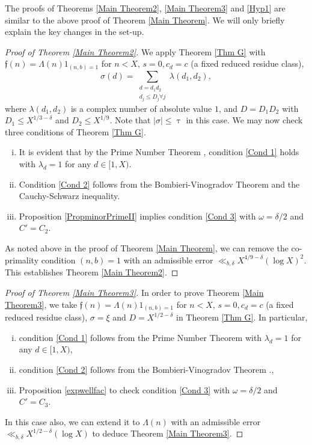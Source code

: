 \documentclass[12pt]{amsart}
\numberwithin{equation}{section}
\theoremstyle{remark}
\theoremstyle{definition}
\begin{document}
The proofs of Theorems \ref{Main Theorem2}, \ref{Main Theorem3} and \ref{Hyp1} are similar to the above proof of Theorem \ref{Main Theorem}. We will only briefly explain the key changes in the set-up.

\begin{proof}[Proof of Theorem \ref{Main Theorem2}]
We apply Theorem \ref{Thm G} with $\mathfrak{f}(n)=\Lambda(n)1_{(n, b)=1}$ for $n<X$, $s=0, c_d=c$ (a fixed reduced residue class), \[{\sigma}(d) =\sum_{\substack{d=d_1d_2\\ d_j \leq D_j \forall j}}\lambda(d_1, d_2),\]
 where $\lambda(d_1, d_2)$ is a complex number of absolute value $1$, and $D=D_1D_2$ with $D_1\leq X^{1/3-\delta}$ and $D_2\leq X^{1/9}$. Note that $|{\sigma}|\leq \uptau$ in this case. We may now check three conditions of Theorem \ref{Thm G}.
 \begin{enumerate}[(i)]
\item It is evident that by the Prime Number Theorem \cite[Chapter 18]{dav}, condition \ref{Cond 1} holds with $\lambda_{d}=1$ for any $d\in [1, X)$.
\item Condition \ref{Cond 2} follows from the Bombieri-Vinogradov Theorem \cite[Chapter 28]{dav} and the Cauchy-Schwarz inequality. 
\item Proposition \ref{PropminorPrimeII} implies condition \ref{Cond 3} with $\omega=\delta/2$ and $C'=C_2$.
\end{enumerate}
 
As noted above in the proof of Theorem \ref{Main Theorem}, we can remove the co-primality condition $(n, b)=1$ with an admissible error $\ll_{b, \delta} X^{{4/9-\delta}}(\log X)^2$. This establishes Theorem \ref{Main Theorem2}.
\end{proof}
 
\begin{proof}[Proof of Theorem \ref{Main Theorem3}]
In order to prove Theorem \ref{Main Theorem3}, we take $\mathfrak{f}(n)=\Lambda(n)1_{(n, b)=1}$ for $n<X$, $s=0, c_d=c$ (a fixed reduced residue class), ${\sigma} =\xi$ and $D=X^{1/2-\delta}$ in Theorem \ref{Thm G}. In particular, 
\begin{enumerate}[(i)]
\item condition \ref{Cond 1} follows from the Prime Number Theorem \cite[Chapter 18]{dav} with $\lambda_d=1$ for any $d\in [1, X)$,
\item condition \ref{Cond 2} follows from the Bombieri-Vinogradov Theorem \cite[Chapter 28]{dav}.,
\item Proposition \ref{expwellfac} to check condition \ref{Cond 3} with $\omega=\delta/2$ and $C'=C_3$.
\end{enumerate}

In this case also, we can extend it to $\Lambda(n)$ with an admissible error $\ll_{b, \delta}X^{1/2-\delta}(\log X)$ to deduce Theorem \ref{Main Theorem3}.
\end{proof}
\end{document}
